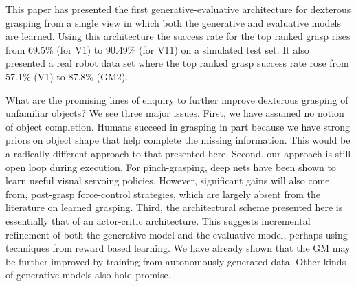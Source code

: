 This paper has presented the first generative-evaluative architecture for dexterous grasping from a single view in which both the generative and evaluative models are learned. Using this architecture the success rate for the top ranked grasp rises from 69.5\% (for V1) to 90.49\% (for V11) on a simulated test set. It also presented a real robot data set where the top ranked grasp success rate rose from 57.1\% (V1) to 87.8\% (GM2).

What are the promising lines of enquiry to further improve dexterous grasping of unfamiliar objects? We see three major issues. First, we have assumed no notion of object completion. Humans succeed in grasping in part because we have strong priors on object shape that help complete the missing information. This would be a radically different approach to that presented here. Second, our approach is still open loop during execution. For pinch-grasping, deep nets have been shown to learn useful visual servoing policies. However, significant gains will also come from, post-grasp force-control strategies, which are largely absent from the literature on learned grasping.  Third, the architectural scheme presented here is essentially that of an actor-critic architecture. This suggests incremental refinement of both the generative model and the evaluative model, perhaps using techniques from reward based learning. We have already shown that the GM may be further improved by training from autonomously generated data. Other kinds of generative models also hold promise.